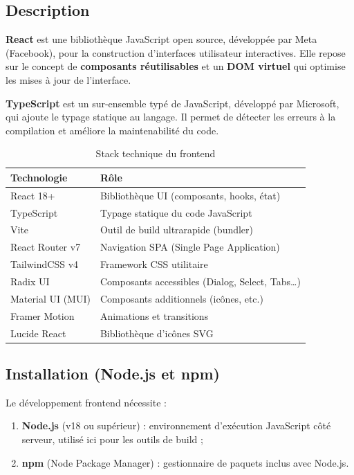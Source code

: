 \subsection{Description}

\textbf{React} est une bibliothèque JavaScript open source, développée par Meta (Facebook), pour la construction d'interfaces utilisateur interactives. Elle repose sur le concept de \textbf{composants réutilisables} et un \textbf{DOM virtuel} qui optimise les mises à jour de l'interface.

\vspace{0.3cm}

\textbf{TypeScript} est un sur-ensemble typé de JavaScript, développé par Microsoft, qui ajoute le typage statique au langage. Il permet de détecter les erreurs à la compilation et améliore la maintenabilité du code.

\begin{table}[H]
\centering
\caption{Stack technique du frontend}
\label{tab:frontend_stack}
\begin{tabularx}{\textwidth}{lX}
\toprule
\textbf{Technologie} & \textbf{Rôle} \\
\midrule
React 18+ & Bibliothèque UI (composants, hooks, état) \\
TypeScript & Typage statique du code JavaScript \\
Vite & Outil de build ultrarapide (bundler) \\
React Router v7 & Navigation SPA (Single Page Application) \\
TailwindCSS v4 & Framework CSS utilitaire \\
Radix UI & Composants accessibles (Dialog, Select, Tabs…) \\
Material UI (MUI) & Composants additionnels (icônes, etc.) \\
Framer Motion & Animations et transitions \\
Lucide React & Bibliothèque d'icônes SVG \\
\bottomrule
\end{tabularx}
\end{table}

\subsection{Installation (Node.js et npm)}

Le développement frontend nécessite :

\begin{enumerate}[noitemsep]
    \item \textbf{Node.js} (v18 ou supérieur) : environnement d'exécution JavaScript côté serveur, utilisé ici pour les outils de build ;
    \item \textbf{npm} (Node Package Manager) : gestionnaire de paquets inclus avec Node.js.
\end{enumerate}


